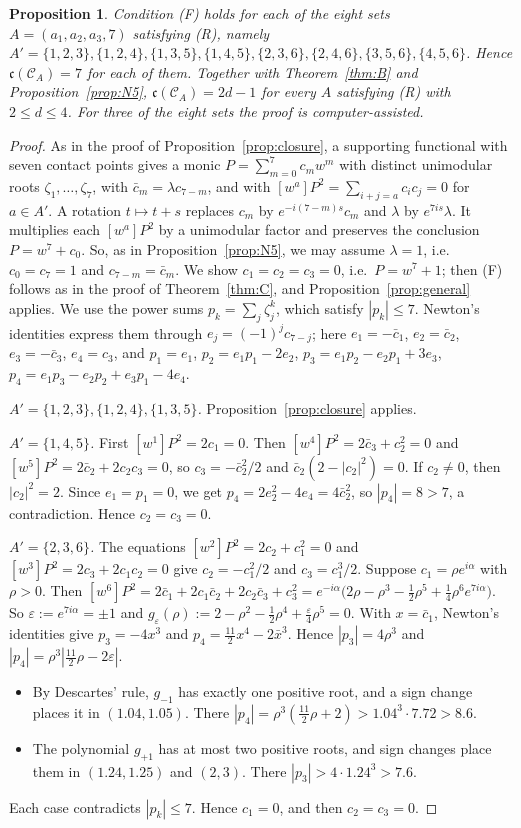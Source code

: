 \documentclass[11pt]{amsart}
\newtheorem{proposition}[theorem]{Proposition}
\theoremstyle{remark}
\newcommand{\cc}{\mathfrak{c}}
\begin{document}
\begin{proposition}\label{prop:N7}
Condition (F) holds for each of the eight sets $A=(a_1,a_2,a_3,7)$ satisfying (R), namely
$A'=\{1,2,3\},\{1,2,4\},\{1,3,5\},\{1,4,5\},\{2,3,6\},\{2,4,6\},\{3,5,6\},\{4,5,6\}$. Hence $\cc(\mathcal C_A)=7$ for each of them. Together with
Theorem~\ref{thm:B} and Proposition~\ref{prop:N5}, $\cc(\mathcal C_A)=2d-1$ for every $A$ satisfying (R) with $2\le d\le4$. For three of the eight sets the
proof is computer-assisted.
\end{proposition}
\begin{proof}
As in the proof of Proposition~\ref{prop:closure}, a supporting functional with seven contact points gives a monic $P=\sum_{m=0}^7c_mw^m$ with distinct
unimodular roots $\zeta_1,\dots,\zeta_7$, with $\bar c_m=\lambda c_{7-m}$, and with $[w^a]P^2=\sum_{i+j=a}c_ic_j=0$ for $a\in A'$. A rotation $t\mapsto t+s$
replaces $c_m$ by $e^{-i(7-m)s}c_m$ and $\lambda$ by $e^{7is}\lambda$. It multiplies each $[w^a]P^2$ by a unimodular factor and preserves the
conclusion $P=w^7+c_0$. So, as in Proposition~\ref{prop:N5}, we may assume $\lambda=1$, i.e.\ $c_0=c_7=1$ and $c_{7-m}=\bar c_m$. We show $c_1=c_2=c_3=0$, i.e.\ $P=w^7+1$;
then (F) follows as in the proof of Theorem~\ref{thm:C}, and Proposition~\ref{prop:general} applies. We use the power sums $p_k=\sum_j\zeta_j^k$, which satisfy
$|p_k|\le7$. Newton's identities express them through $e_j=(-1)^jc_{7-j}$; here $e_1=-\bar c_1$, $e_2=\bar c_2$, $e_3=-\bar c_3$, $e_4=c_3$, and
$p_1=e_1$, $p_2=e_1p_1-2e_2$, $p_3=e_1p_2-e_2p_1+3e_3$, $p_4=e_1p_3-e_2p_2+e_3p_1-4e_4$.

\emph{$A'=\{1,2,3\},\{1,2,4\},\{1,3,5\}$.} Proposition~\ref{prop:closure} applies.

\emph{$A'=\{1,4,5\}$.} First $[w^1]P^2=2c_1=0$. Then $[w^4]P^2=2\bar c_3+c_2^2=0$ and $[w^5]P^2=2\bar c_2+2c_2c_3=0$, so $c_3=-\bar c_2^2/2$ and
$\bar c_2(2-|c_2|^2)=0$. If $c_2\ne0$, then $|c_2|^2=2$. Since $e_1=p_1=0$, we get $p_4=2e_2^2-4e_4=4\bar c_2^2$, so $|p_4|=8>7$, a contradiction. Hence $c_2=c_3=0$.

\emph{$A'=\{2,3,6\}$.} The equations $[w^2]P^2=2c_2+c_1^2=0$ and $[w^3]P^2=2c_3+2c_1c_2=0$ give $c_2=-c_1^2/2$ and $c_3=c_1^3/2$. Suppose $c_1=\rho e^{i\alpha}$ with $\rho>0$. Then
$[w^6]P^2=2\bar c_1+2c_1\bar c_2+2c_2\bar c_3+c_3^2=e^{-i\alpha}\big(2\rho-\rho^3-\frac12\rho^5+\frac14\rho^6e^{7i\alpha}\big)$. So $\varepsilon:=e^{7i\alpha}=\pm1$ and
$g_\varepsilon(\rho):=2-\rho^2-\frac12\rho^4+\frac\varepsilon4\rho^5=0$. With $x=\bar c_1$, Newton's identities give $p_3=-4x^3$ and $p_4=\frac{11}2x^4-2\bar x^3$. Hence
$|p_3|=4\rho^3$ and $|p_4|=\rho^3|\frac{11}2\rho-2\varepsilon|$.
\begin{itemize}
\item By Descartes' rule, $g_{-1}$ has exactly one positive root, and a sign change places it in $(1.04,1.05)$. There $|p_4|=\rho^3(\frac{11}2\rho+2)>1.04^3\cdot7.72>8.6$.
\item The polynomial $g_{+1}$ has at most two positive roots, and sign changes place them in $(1.24,1.25)$ and $(2,3)$. There $|p_3|>4\cdot1.24^3>7.6$.
\end{itemize}
Each case contradicts $|p_k|\le7$. Hence $c_1=0$, and then $c_2=c_3=0$.


\end{proof}
\end{document}
